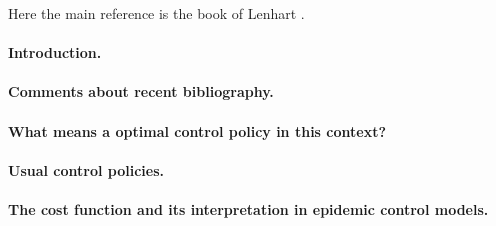 Here the main reference is the book of Lenhart 
\cite{Lenhart2002}.
\paragraph{Introduction.}
\paragraph{Comments about recent bibliography.}
\paragraph{What means a optimal control policy in this context?}
\paragraph{Usual control policies.}
\paragraph{The cost function and its interpretation in epidemic control models.}